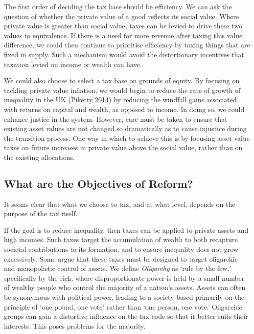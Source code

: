 \documentclass[]{tufte-handout}
\begin{document}
The first order of deciding the tax base should be efficiency. We can
ask the question of whether the private value of a good reflects its
social value. Where private value is greater than social value, taxes
can be levied to drive these two values to equivalence. If there is a
need for more revenue after taxing this value difference, we could then
continue to prioritise efficiency by taxing things that are fixed in
supply. Such a mechanism would avoid the distortionary incentives that
taxation levied on income or wealth can have.

We could also choose to select a tax base on grounds of equity. By
focusing on tackling private value inflation, we would begin to reduce
the rate of growth of inequality in the UK (Piketty
\protect\hyperlink{ref-Piketty2014a}{2014}) by reducing the windfall
gains associated with returns on capital and wealth, as opposed to
income. In doing so, we could enhance justice in the system. However,
care must be taken to ensure that existing asset values are not changed
so dramatically as to cause injustice during the transition process. One
way in which to achieve this is by focusing asset value taxes on future
increases in private value above the social value, rather than on the
existing allocations.

\hypertarget{what-are-the-objectives-of-reform}{%
\subsection{What are the Objectives of
Reform?}\label{what-are-the-objectives-of-reform}}

It seems clear that what we choose to tax, and at what level, depends on
the purpose of the tax itself.

If the goal is to reduce inequality, then taxes can be applied to
private assets and high incomes. Such taxes target the accumulation of
wealth to both recapture societal contributions to its formation, and to
ensure inequality does not grow excessively. Some argue that these taxes
must be designed to target oligarchic and monopolistic control of
assets. We define \emph{Oligarchy} as `rule by the few,' specifically by
the rich, where disproportionate power is held by a small number of
wealthy people who control the majority of a nation's assets. Assets can
often be synonymous with political power, leading to a society based
primarily on the principle of `one pound, one vote' rather than `one
person, one vote.' Oligarchic groups can gain a distortive influence on
the tax code so that it better suits their interests. This poses
problems for the majority.
\end{document}
